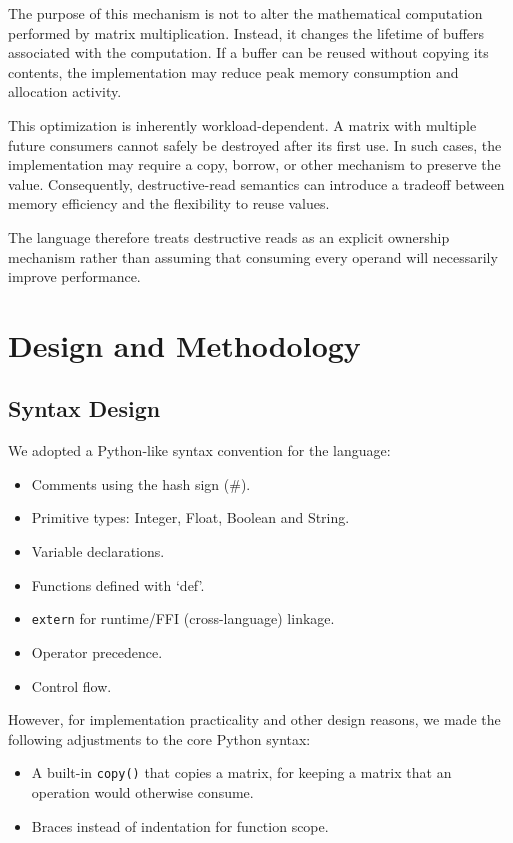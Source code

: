 \documentclass[a4paper]{article}
\begin{document}
	The purpose of this mechanism is not to alter the mathematical computation performed by matrix multiplication. Instead, it changes the lifetime of buffers associated with the computation. If a buffer can be reused without copying its contents, the implementation may reduce peak memory consumption and allocation activity.
	
	This optimization is inherently workload-dependent. A matrix with multiple future consumers cannot safely be destroyed after its first use. In such cases, the implementation may require a copy, borrow, or other mechanism to preserve the value. Consequently, destructive-read semantics can introduce a tradeoff between memory efficiency and the flexibility to reuse values.
	
	The language therefore treats destructive reads as an explicit ownership mechanism rather than assuming that consuming every operand will necessarily improve performance.
	
	\section{Design and Methodology}
	
	\subsection{Syntax Design}
	
	We adopted a Python-like syntax convention for the language:
	\begin{itemize}
		\item Comments using the hash sign (\#).
		\item Primitive types: Integer, Float, Boolean and String.
		\item Variable declarations.
		\item Functions defined with `def'.
		\item \texttt{extern} for runtime/FFI (cross-language) linkage.
		\item Operator precedence.
		\item Control flow.
	\end{itemize}
	However, for implementation practicality and other design reasons, we made the following adjustments to the core Python syntax:
	\begin{itemize}
		\item A built-in \texttt{copy()} that copies a matrix, for keeping a matrix that an operation would otherwise consume.
		\item Braces instead of indentation for function scope.
	\end{itemize}
	
\end{document}
